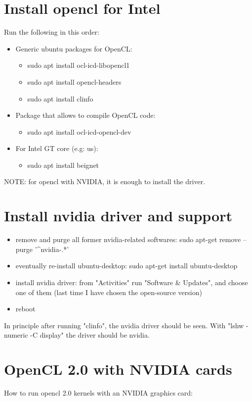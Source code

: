 \documentclass[a4paper]{article}
\begin{document}
\section*{Install opencl for Intel}
Run the following in this order:
\begin{itemize}
\item  Generic ubuntu packages for OpenCL:
  \begin{itemize}
  \item sudo apt install ocl-icd-libopencl1
  \item sudo apt install opencl-headers
  \item sudo apt install clinfo
  \end{itemize}
\item Package that allows to compile OpenCL code:
   \begin{itemize}
   \item sudo apt install ocl-icd-opencl-dev
   \end{itemize}
\item For Intel GT core (e.g: us):
  \begin{itemize}
   \item sudo apt install beignet
   \end{itemize}
 \end{itemize}
NOTE: for opencl with NVIDIA, it is enough to install the driver.

\section*{Install nvidia driver and support}

\begin{itemize}
  \item remove and purge all former nvidia-related softwares: sudo apt-get remove --purge '^nvidia-.*'
  \item eventually re-install ubuntu-desktop: sudo apt-get install ubuntu-desktop
  \item install nvidia driver: from "Activities" run "Software & Updates", and choose one of them 
  (last time I have chosen the open-source version)
  \item reboot
\end{itemize}
In principle after running "clinfo", the nvidia driver should be seen. With "lshw -numeric -C display" the driver
should be nvidia.

\section*{OpenCL 2.0 with NVIDIA cards}
How to run opencl 2.0 kernels with an NVIDIA graphics card:
\end{document}
